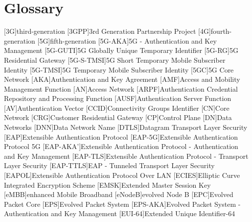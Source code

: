 \chapter{Glossary}

\footnotesize
\SingleSpacing

\begin{multicols}{2}
    \begin{acronym}[AAAAAA]
        [3G]{third-generation}
        [3GPP]{3rd Generation Partnership Project}
        [4G]{fourth-generation}
        [5G]{fifth-generation}
        [5G-AKA]{5G - Authentication and Key Management}
        [5G-GUTI]{5G Globally Unique Temporary Identifier}
        [5G-RG]{5G Residential Gateway}
        [5G-S-TMSI]{5G Short Temporary Mobile Subscriber Identity}
        [5G-TMSI]{5G Temporary Mobile Subscriber Identity}
        [5GC]{5G Core Network}
        [AKA]{Authentication and Key Agreement}
        [AMF]{Access and Mobility Management Function}
        [AN]{Access Network}
        [ARPF]{Authentication Credential Repository and Processing Function}
        [AUSF]{Authentication Server Function}
        [AV]{Authentication Vector}
        [CCID]{Connectivity Groups Identifier}
        [CN]{Core Network}
        [CRG]{Customer Residential Gateway}
        [CP]{Control Plane}
        [DN]{Data Networks}
        [DNN]{Data Network Name}
        [DTLS]{Datagram Transport Layer Security}
        [EAP]{Extensible Authentication Protocol}
        [EAP-5G]{Extensible Authentication Protocol 5G}
        [EAP-AKA']{Extensible Authentication Protocol - Authentication and Key Management}
        [EAP-TLS]{Extensible Authentication Protocol - Transport Layer Security}
        [EAP-TTLS]{EAP - Tunneled Transport Layer Security}
        [EAPOL]{Extensible Authentication Protocol Over LAN}
        [ECIES]{Elliptic Curve Integrated Encryption Scheme}
        [EMSK]{Extended Master Session Key}
        [eMBB]{enhanced Mobile Broadband}
        [eNodeB]{evolved Node B}
        [EPC]{Evolved Packet Core}
        [EPS]{Evolved Packet System}
        [EPS-AKA]{Evolved Packet System - Authentication and Key Management}
        [EUI-64]{Extended Unique Identifier-64}

\end{acronym}
\end{multicols}
